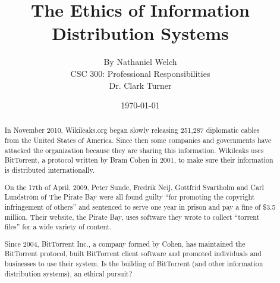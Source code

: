 \documentclass[11pt]{article}
\begin{document}
\title{\vfill The Ethics of Information Distribution Systems} %
\author{
By Nathaniel Welch\vspace{10pt}\\
CSC 300: Professional Responsibilities\vspace{10pt}\\
Dr. Clark Turner\vspace{10pt}\\
}
\date{\today}

\maketitle

\vfill
\begin{abstract}
In November 2010, Wikileaks.org began slowly releasing 251,287 diplomatic cables from the United States of America. \cite{cablegate} Since then some companies and governments have attacked the organization because they are sharing this information. Wikileaks uses BitTorrent, a protocol written by Bram Cohen in 2001, to make sure their information is distributed internationally.

On the 17th of April, 2009, Peter Sunde, Fredrik Neij, Gottfrid Svartholm and Carl Lundström of The Pirate Bay were all found guilty ``for promoting the copyright infringement of others'' and sentenced to serve one year in prison and pay a fine of \$3.5 million. \cite{tpbverdict} Their website, the Pirate Bay, uses software they wrote to collect ``torrent files'' for a wide variety of content.

Since 2004, BitTorrent Inc., a company formed by Cohen, has maintained the BitTorrent protocol, built BitTorrent client software and promoted individuals and businesses to use their system. Is the building of BitTorrent (and other information distribution systems), an ethical pursuit?
\end{abstract}

\thispagestyle{empty}
\newpage
\thispagestyle{empty}
\tableofcontents
\newpage

\end{document}
